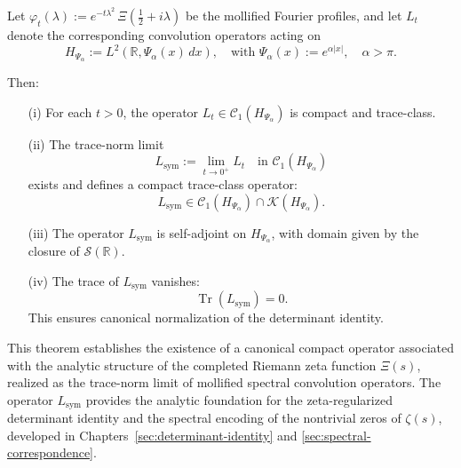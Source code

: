 \begin{theorem}
\label{thm:existence-Lsym}
Let \( \varphi_t(\lambda) := e^{-t\lambda^2} \, \Xi\left( \tfrac{1}{2} + i\lambda \right) \) be the mollified Fourier profiles, and let \( L_t \) denote the corresponding convolution operators acting on
\[
H_{\Psi_\alpha} := L^2(\mathbb{R}, \Psi_\alpha(x)\, dx), \quad \text{with } \Psi_\alpha(x) := e^{\alpha |x|}, \quad \alpha > \pi.
\]

Then:
\begin{enumerate}
  \item[\textnormal{(i)}] For each \( t > 0 \), the operator \( L_t \in \mathcal{C}_1(H_{\Psi_\alpha}) \) is compact and trace-class.

  \item[\textnormal{(ii)}] The trace-norm limit
  \[
  L_{\mathrm{sym}} := \lim_{t \to 0^+} L_t \quad \text{in } \mathcal{C}_1(H_{\Psi_\alpha})
  \]
  exists and defines a compact trace-class operator:
  \[
  L_{\mathrm{sym}} \in \mathcal{C}_1(H_{\Psi_\alpha}) \cap \mathcal{K}(H_{\Psi_\alpha}).
  \]

  \item[\textnormal{(iii)}] The operator \( L_{\mathrm{sym}} \) is self-adjoint on \( H_{\Psi_\alpha} \), with domain given by the closure of \( \mathcal{S}(\mathbb{R}) \).

  \item[\textnormal{(iv)}] The trace of \( L_{\mathrm{sym}} \) vanishes:
  \[
  \operatorname{Tr}(L_{\mathrm{sym}}) = 0.
  \]
  This ensures canonical normalization of the determinant identity.
\end{enumerate}

\medskip
\noindent
This theorem establishes the existence of a canonical compact operator associated with the analytic structure of the completed Riemann zeta function \( \Xi(s) \), realized as the trace-norm limit of mollified spectral convolution operators. The operator \( L_{\mathrm{sym}} \) provides the analytic foundation for the zeta-regularized determinant identity and the spectral encoding of the nontrivial zeros of \( \zeta(s) \), developed in Chapters~\ref{sec:determinant-identity} and \ref{sec:spectral-correspondence}.
\end{theorem}
